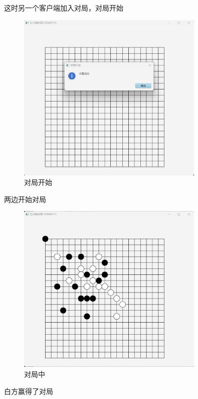 \documentclass[utf8]{article}
\begin{document}
这时另一个客户端加入对局，对局开始
\begin{figure}[H]
    \centering
    \includegraphics[width=0.8\textwidth]{pictures/19}
    \caption{对局开始}
\end{figure}
两边开始对局
\begin{figure}[H]
    \centering
    \includegraphics[width=0.8\textwidth]{pictures/20}
    \caption{对局中}
\end{figure}
白方赢得了对局
\end{document}
